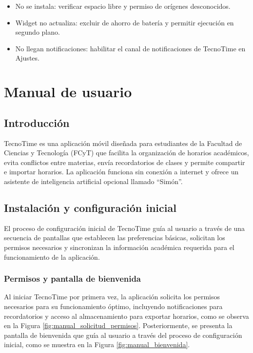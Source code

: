 \begin{itemize}
  \item No se instala: verificar espacio libre y permiso de orígenes desconocidos.
  \item Widget no actualiza: excluir de ahorro de batería y permitir ejecución en segundo plano.
  \item No llegan notificaciones: habilitar el canal de notificaciones de TecnoTime en Ajustes.
\end{itemize}

\chapter{Manual de usuario}\label{ann:manual-usuario}

\section{Introducción}
TecnoTime es una aplicación móvil diseñada para estudiantes de la Facultad de Ciencias y Tecnología (FCyT) que facilita la organización de horarios académicos, evita conflictos entre materias, envía recordatorios de clases y permite compartir e importar horarios. La aplicación funciona sin conexión a internet y ofrece un asistente de inteligencia artificial opcional llamado ``Simón''.

\section{Instalación y configuración inicial}

El proceso de configuración inicial de TecnoTime guía al usuario a través de una secuencia de pantallas que establecen las preferencias básicas, solicitan los permisos necesarios y sincronizan la información académica requerida para el funcionamiento de la aplicación.

\Needspace{0.58\textheight}
\subsection{Permisos y pantalla de bienvenida}
Al iniciar TecnoTime por primera vez, la aplicación solicita los permisos necesarios para su funcionamiento óptimo, incluyendo notificaciones para recordatorios y acceso al almacenamiento para exportar horarios, como se observa en la Figura \ref{fig:manual_solicitud_permisos}. Posteriormente, se presenta la pantalla de bienvenida que guía al usuario a través del proceso de configuración inicial, como se muestra en la Figura \ref{fig:manual_bienvenida}.

